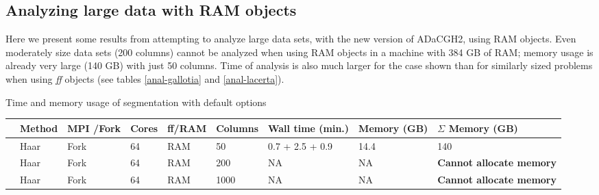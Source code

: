 \documentclass[a4paper,11pt]{article}
\newcounter{magicrownumbers}
\newcommand\rownumber{\stepcounter{magicrownumbers}\arabic{magicrownumbers}}
\begin{document}
\clearpage
\subsection{Analyzing large data with RAM objects}
\label{ramobj}
Here we present some results from attempting to analyze large data sets,
with the new version of ADaCGH2, using RAM objects. Even moderately size
data sets (200 columns) cannot be analyzed when using RAM objects in a
machine with 384 GB of RAM; memory usage is already very large (140 GB)
with just 50 columns. Time of analysis is also much larger for the case
shown than for similarly sized problems when using \textit{ff} objects
(see tables \ref{anal-gallotia} and \ref{anal-lacerta}).


\renewcommand{\arraystretch}{1.4}

\begin{center}
  
\begin{threeparttable}

  \caption{Time and memory usage of segmentation with default options}    
  \begin{tabular}{lp{1.2cm}p{1.0cm}p{1.0cm}p{1.1cm}p{1.35cm}p{3.0cm}p{1.6cm}p{1.6cm}}

    \hline\hline

&Method& MPI /Fork & Cores & ff/RAM & Columns & Wall time (min.) & Memory (GB) & $\Sigma$ Memory (GB)\\

\hline
\rownumber&Haar & Fork &64  & RAM & 50 & 0.7 + 2.5 + 0.9\tnote{a}& 14.4 & 140\\
\rownumber&Haar & Fork &64  & RAM & 200 & NA & NA & \textbf{Cannot allocate memory}\\
\rownumber&Haar & Fork &64  & RAM & 1000 & NA & NA & \textbf{Cannot allocate memory} \\
\hline
   
  \end{tabular}

  \begin{tablenotes}
    {\footnotesize

}
\end{tablenotes}
\end{threeparttable}
\end{center}
\end{document}
